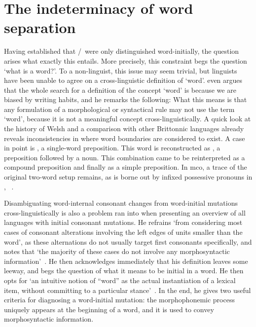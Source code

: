 \section{The indeterminacy of word separation}
\label{sec:indet-word-separ}
Having established that \lT/\xD\ were only distinguished word-initially, the question arises what exactly this entails. More precisely, this constraint begs the question `what is a word?'.
To a non-linguist, this issue may seem trivial, but linguists have been unable to agree on a cross-linguistic definition of `word'.
\Textcite[28]{haspelmath_indeterminacy_2011} even argues that the whole search for a definition of the concept `word' is because we are biased by writing habits, and he remarks the following: 
What this means is that any formulation of a morphological or syntactical rule may not use the term `word', because it is not a meaningful concept cross-linguistically. 
A quick look at the history of Welsh and a comparison with other Brittonnic languages already reveals inconsistencies in where word boundaries are considered to exist.
A case in point is , a single-word preposition.
This word is reconstructed as  \autocite[258]{schrijver_studies_1995}, a preposition followed by a noun.
This combination came to be reinterpreted as a compound preposition and finally as a simple preposition.
In \gls{mco}, a trace of the original two-word setup remains, as is borne out by infixed possessive pronouns in , \etc~\autocite[120]{koch_neo-brittonic_1989}.

Disambiguating word-internal consonant changes from word-initial mutations cross-linguistically is also a problem \textcite{iosad_right_2010} ran into when presenting an overview of all languages with initial consonant mutations.
He refrains `from considering most cases of consonant alterations involving the left edges of units smaller than the word', as these alternations do not usually target first consonants specifically, and notes that `the majority of these cases do not involve any morphosyntactic information'~\autocite[108]{iosad_right_2010}.
He then acknowledges immediately that his definition leaves some leeway, and begs the question of what it means to be initial in a word.
He then opts for `an intuitive notion of ``word'' as the actual instantiation of a lexical item, without committing to a particular stance'~\autocite[109]{iosad_right_2010}.
In the end, he gives two useful criteria for diagnosing a word-initial mutation: the morphophonemic process uniquely appears at the beginning of a word, and it is used to convey morphosyntactic information.

